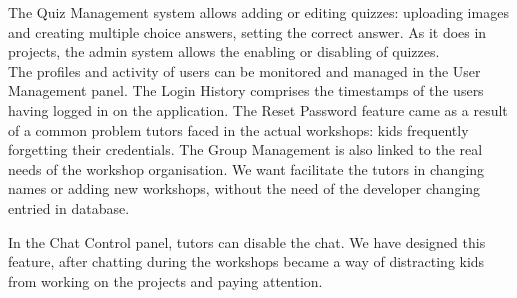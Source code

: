 The Quiz Management system allows adding or editing quizzes: uploading images and creating multiple choice answers, setting the correct answer. As it does in projects, the admin system allows the enabling or disabling of quizzes.\\

The profiles and activity of users can be monitored and managed in the User Management panel. The Login History comprises the timestamps of the users having logged in on the application. The Reset Password feature came as a result of a common problem tutors faced in the actual workshops: kids frequently forgetting their credentials. The Group Management is also linked to the real needs of the workshop organisation. We want facilitate the tutors in changing names or adding new workshops, without the need of the developer changing entried in database.

In the Chat Control panel, tutors can disable the chat. We have designed this feature, after chatting during the workshops became a way of distracting kids from working on the projects and paying attention.






















